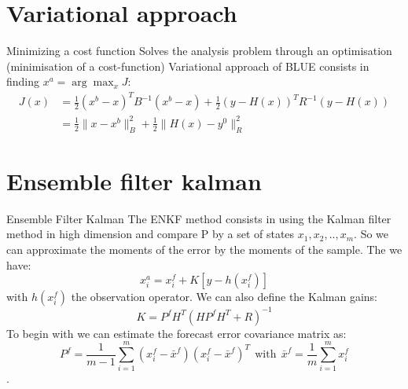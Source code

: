 \documentclass[10pt,xcolor={table,dvipsnames},t]{beamer}
\begin{document}
\section{Variational approach}
    \begin{frame}{Minimizing a cost function}
        Solves the analysis problem through an optimisation (minimisation of a cost-function)
        Variational approach of BLUE consists in finding $x^a=\arg\max_{x}J$:
        $$\begin{aligned}
            J(x)&=\frac{1}{2}(x^b-x)^TB^{-1}(x^b-x)+\frac{1}{2}(y-H(x))^TR^{-1}(y-H(x)) \\
            &=\frac{1}{2}\|x-x^b\|_B^2+\frac{1}{2}\|H(x)-y^0\|_R^2
        \end{aligned}$$
    \end{frame}
    \begin{frame}
    \end{frame}
\section{Ensemble filter kalman}
    \begin{frame}{Ensemble Filter Kalman}
        The ENKF method consists in using the Kalman filter method in high dimension and compare P by a set of states $x_1,x_2,..,x_{m}$. So we can approximate the moments of the error by the moments of the sample.
        The we have:
        $$x_i^a=x_i^f+K[y-h(x_i^f)]$$
        with $h(x_i^f)$ the observation operator.
        We can also define the Kalman gains: 
        $$K=P^f H^T(HP^f H^T+R)^{-1}$$
        To begin with we can estimate the
        forecast error covariance matrix as:
        $$P^f=\frac{1}{m-1}\sum_{i=1}^{m}(x_i^f-\bar{x}^f)(x_i^f-\bar{x}^f)^T~~\text{with}~~\bar{x}^f=\frac{1}{m}\sum_{i=1}^{m}x_i^f $$ .
    \end{frame}
\end{document}
